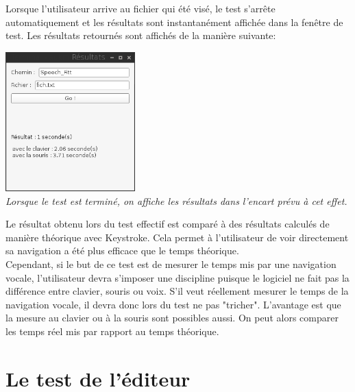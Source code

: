 \documentclass[a4paper, 11pt]{report}
\begin{document}
		Lorsque l'utilisateur arrive au fichier qui été visé, le test s'arrête automatiquement et les résultats sont instantanément affichée dans la fenêtre de test. Les résultats retournés sont affichés de la manière suivante:\\
		\begin{center}
			\includegraphics[width=5cm]{test_finished}\\
			\emph{Lorsque le test est terminé, on affiche les résultats dans l'encart prévu à cet effet.\\}
		\end{center}
		
		Le résultat obtenu lors du test effectif est comparé à des résultats calculés de manière théorique avec Keystroke. Cela permet à l'utilisateur de voir directement sa navigation a été plus efficace que le temps théorique.\\
	Cependant, si le but de ce test est de mesurer le temps mis par une navigation vocale, l'utilisateur devra s'imposer une discipline puisque le logiciel ne fait pas la différence entre clavier, souris ou voix. S'il veut réellement mesurer le temps de la navigation vocale, il devra donc lors du test ne pas "tricher". L'avantage est que la mesure au clavier ou à la souris sont possibles aussi. On peut alors comparer les temps réel mis par rapport au temps théorique.
	
	
		\section{Le test de l'éditeur}
		
		
	
	
	
	
	
	
		
	\newpage	
		
	\tableofcontents

		
\end{document}
